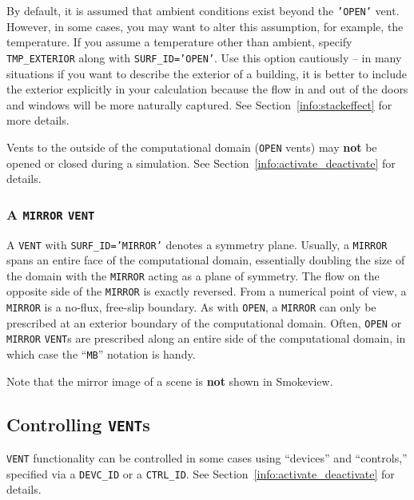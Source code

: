 \documentclass[11pt]{book}
\newcommand{\ct}{\tt\small}
\begin{document}
By default, it is assumed that ambient conditions exist beyond the
{\ct 'OPEN'} vent. However, in some cases, you may want to alter this assumption, for example, the temperature. If you assume a temperature other than
ambient, specify {\ct TMP\_EXTERIOR} along with {\ct SURF\_ID='OPEN'}. Use this option cautiously -- in many situations if you want to describe the exterior of a building, it is better
to include the exterior explicitly in your calculation because the flow in and out of the doors and windows will be more naturally captured. See Section~\ref{info:stackeffect} for more
details.

\begin{warning}
Vents to the outside of the computational domain ({\ct OPEN} vents)
may {\bf not} be opened or closed during a simulation. See Section~\ref{info:activate_deactivate} for details.
\end{warning}

\subsubsection{A {\tt MIRROR} {\tt VENT}}

A {\ct VENT} with {\ct SURF\_ID='MIRROR'} denotes a symmetry plane.
Usually, a {\ct MIRROR} spans an entire face of the computational
domain, essentially doubling the size of the domain with the {\ct MIRROR}
acting as a plane of symmetry. The flow on the opposite side of the
{\ct MIRROR} is exactly reversed. From a numerical point of view,
a {\ct MIRROR} is a no-flux, free-slip boundary.
As with {\ct OPEN}, a {\ct MIRROR} can only be prescribed at an
exterior boundary of the computational domain.
Often, {\ct OPEN} or {\ct MIRROR} {\ct VENT}s are prescribed along an
entire side of the computational domain, in which case the ``{\ct MB}''
notation is handy.

\begin{warning}
\noindent
Note that the mirror image of a scene is {\bf not} shown in Smokeview.
\end{warning}






\subsection{Controlling {\tt VENT}s}

{\ct VENT} functionality can be controlled in some cases using ``devices'' and ``controls,'' specified via a {\ct DEVC\_ID} or a {\ct CTRL\_ID}.
See Section~\ref{info:activate_deactivate} for details.
\end{document}
